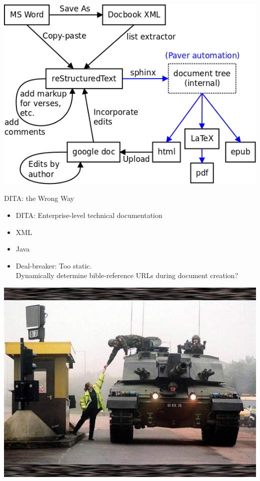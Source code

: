 \documentclass{beamer}
\begin{document}
\begin{frame}
    \includegraphics[keepaspectratio=true, width=\paperwidth]{theorest_process.png}
\end{frame}
    
\begin{frame}{DITA: the Wrong Way}
    \begin{itemize}
    \item DITA: Enterprise-level technical documentation
    \item XML
    \item Java
    \item Deal-breaker: Too static.\\
        Dynamically determine bible-reference URLs during document creation?
    \end{itemize}
\end{frame}

\begin{frame}[plain]
    \centerline{\includegraphics[keepaspectratio=true, width=\paperwidth]{tank-toll.jpg}}
\end{frame}
\end{document}
